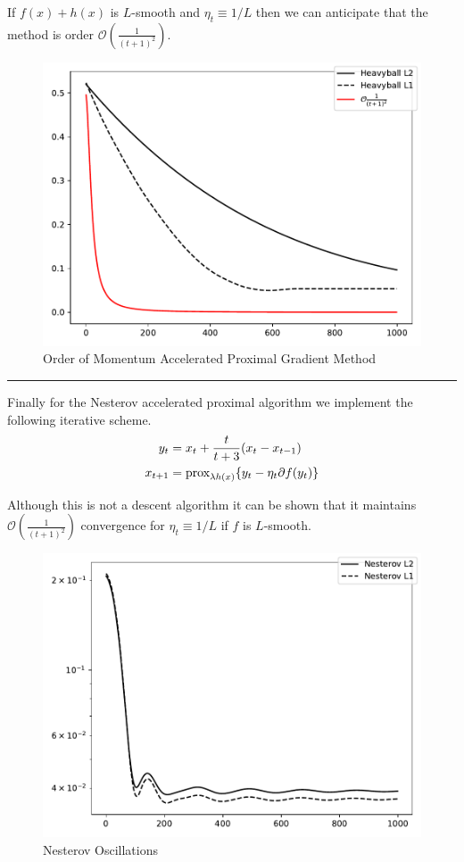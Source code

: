\documentclass[11pt, answers]{exam}
\begin{document}
\begin{questions}
\begin{solution}
		If $f(x)+h(x)$ is $L$-smooth and $\eta_t\equiv 1/L$ then we can anticipate that the method is order $\mathcal{O}(\frac{1}{(t+1)^2})$.			
		\begin{figure}[H]
		\centering
		\includegraphics[width=.75\textwidth]{../out/HBGrad.pdf}
		\caption{Order of Momentum Accelerated Proximal Gradient Method}
		\end{figure}
		
		\vspace{.5in}\hrule\vspace{.5in}
		
		Finally for the Nesterov accelerated proximal algorithm we implement the following iterative scheme.
		\begin{align*}
		y_t &= x_t+\frac{t}{t+3}(x_t-x_{t-1})\\
		x_{t+1}&=\text{prox}_{\lambda h(x)}\{y_t -\eta_t\partial f(y_t)\}
		\end{align*}
		
		Although this is not a descent algorithm it can be shown that it maintains $\mathcal{O}(\frac{1}{(t+1)^2})$ convergence for $\eta_t\equiv 1/L$ if $f$ is $L$-smooth.
		\begin{figure}[H]
		\centering
		\includegraphics[width=.75\textwidth]{../out/NestGrad.pdf}
		\caption{Nesterov Oscillations}
		\end{figure}
		

\end{solution}
\end{questions}
\end{document}
